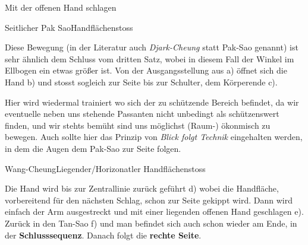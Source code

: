 \begin{WTSatz}{Mit der offenen Hand schlagen}%

	
	\begin{WTSatzTeil}{Seitlicher Pak Sao}{Handfl\"achenstoss}

		Diese Bewegung (in der Literatur auch \textit{Djark-Cheung} statt Pak-Sao genannt) ist sehr \"ahnlich dem Schluss vom dritten Satz, wobei in diesem Fall der Winkel im Ellbogen ein etwas gr\"o{\ss}er ist. Von der Ausgangsstellung aus a) \"offnet sich die Hand b) und stosst sogleich zur Seite bis zur Schulter, dem K\"orperende c).
		
		Hier wird wiedermal trainiert wo sich der zu sch\"utzende Bereich befindet, da wir eventuelle neben uns stehende Passanten nicht unbedingt als sch\"utzenswert finden, und wir stehts bem\"uht sind uns m\"oglichst (Raum-) \"okonmisch zu bewegen. Auch sollte hier das Prinzip von \textit{Blick folgt Technik} eingehalten werden, in dem die Augen dem Pak-Sao zur Seite folgen.
		
		
	\end{WTSatzTeil}
	\begin{WTSatzTeil}{Wang-Cheung}{Liegender/Horizonatler Handfl\"achenstoss}
		
		Die Hand wird bis zur Zentrallinie zur\"uck gef\"uhrt d) wobei die Handfl\"ache, vorbereitend f\"ur den n\"achsten Schlag, schon zur Seite gekippt wird. Dann wird einfach der Arm ausgestreckt und mit einer liegenden offenen Hand geschlagen e). Zur\"uck in den Tan-Sao f) und man befindet sich auch schon wieder am Ende, in der \textbf{Schlusssequenz}. Danach folgt die \textbf{rechte Seite}.
		
	\end{WTSatzTeil}
\end{WTSatz}




